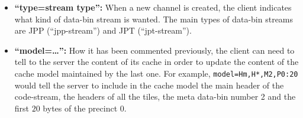 \begin{itemize}
\item \textbf{``type=stream type'':} When a new channel is created, the
client indicates what kind of data-bin stream is wanted. The main
types of data-bin streams are JPP (``jpp-stream'') and JPT
(``jpt-stream'').

\item \textbf{``model=\ldots'':} How it has been commented previously,
the client can need to tell to the server the content of its cache
in order to update the content of the cache model maintained by
the last one. For example, \texttt{model=Hm,H*,M2,P0:20}
would tell the server to include in the cache model 
the main header of the code-stream, the headers of all the tiles,
the meta data-bin number 2 and the first $20$ bytes
of the precinct $0$.
\end{itemize}

